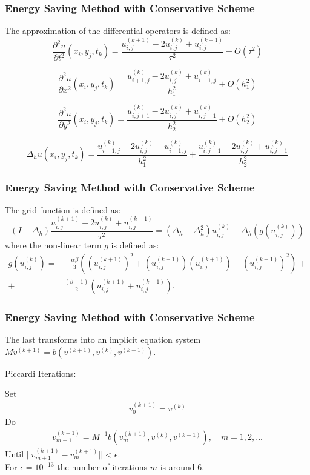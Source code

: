 \documentclass{beamer}
\begin{document}
\begin{frame}
\frametitle{Energy Saving Method with Conservative Scheme}


The approximation of the differential operators is defined as:
\begin{equation}
\frac{\partial^2 u}{\partial t^2}(x_i, y_j, t_k ) = \frac{ u^{(k+1)}_{i, j} - 2u^{(k)}_{i,j} + u^{(k-1)}_{i,j} }{\tau^2} + O(\tau^2) 
\end{equation}

\begin{equation}
\frac{\partial^2 u}{\partial x^2}(x_i, y_j, t_k ) = \frac{ u^{(k)}_{i+1, j} - 2u^{(k)}_{i,j} + u^{(k)}_{i-1,j} }{h_1^2} + O(h_1^2) 
\end{equation}

\begin{equation}
\frac{\partial^2 u}{\partial y^2}(x_i, y_j, t_k ) = \frac{ u^{(k)}_{i, j+1} - 2u^{(k)}_{i,j} + u^{(k)}_{i,j-1} }{h_2^2} + O(h_2^2) 
\end{equation}


\begin{equation}
\Delta_h u(x_i, y_j, t_k )  = \frac{ u^{(k)}_{i+1, j} - 2u^{(k)}_{i,j} + u^{(k)}_{i-1,j} }{h_1^2} + \frac{ u^{(k)}_{i, j+1} - 2u^{(k)}_{i,j} + u^{(k)}_{i,j-1} }{h_2^2}
\end{equation}

\end{frame}

\begin{frame}
\frametitle{Energy Saving Method with Conservative Scheme}
The grid function is defined as:
\begin{equation}
(I-\Delta_h)\frac{ u^{(k+1)}_{i, j} - 2u^{(k)}_{i,j} + u^{(k-1)}_{i,j} }{\tau^2} = (\Delta_h - \Delta_h^2)u^{(k)}_{i,j} + \Delta_h(g(u^{(k)}_{i,j}))
\end{equation}
%
where the non-linear term $g$ is defined as:
\begin{align}
g(u^{(k)}_{i,j})=& -\frac{\alpha \beta} { 3 } \left( (u^{(k+1)}_{i,j})^2 + (u^{(k-1)}_{i,j})(u^{(k+1)}_{i,j}) + (u^{(k-1)}_{i,j})^2 \right) + \nonumber\\
+&\frac{ (\beta - 1 )}{ 2 }\left( u^{(k+1)}_{i,j} + u^{(k-1)}_{i,j} \right).
\end{align}


\end{frame}

\begin{frame}
\frametitle{Energy Saving Method with Conservative Scheme}
The last transforms into an implicit equation system $M v^{(k+1)} = b( v^{(k+1)} ,  v^{(k)} ,  v^{(k-1)}  )$.

Piccardi  Iterations:

Set
\begin{align}
 v^{(k+1)}_0 =  v^{(k)}
\end{align}
Do
\begin{align}
 v^{(k+1)}_{m+1} =  M^{-1}  b( v^{(k+1)}_{m} ,  v^{(k)} , v^{(k-1)}  ), \quad m=1,2, ...
\end{align}
Until $||  v^{(k+1)}_{m+1} -  v^{(k+1)}_{m}|| < \epsilon$. 
\\
For $\epsilon = 10^{-13}$ the number of iterations $m$ is around 6.
\end{frame}
\end{document}
